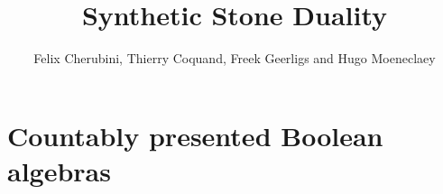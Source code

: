 \documentclass{../util/zariski-small}
\title{Synthetic Stone Duality}
\begin{document}
\author{Felix Cherubini, Thierry Coquand, Freek Geerligs and Hugo Moeneclaey}

\maketitle

%
\section{Countably presented Boolean algebras}
\end{document}
